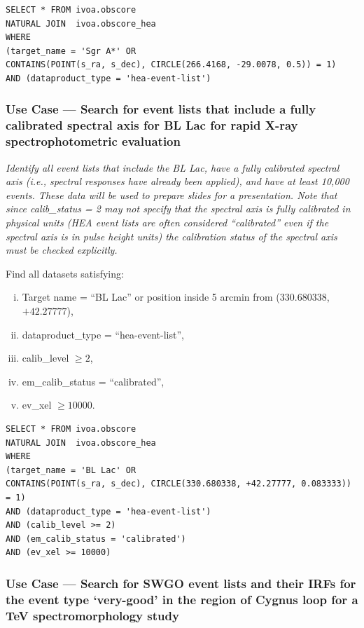 \begin{verbatim}
SELECT * FROM ivoa.obscore
NATURAL JOIN  ivoa.obscore_hea
WHERE
(target_name = 'Sgr A*' OR
CONTAINS(POINT(s_ra, s_dec), CIRCLE(266.4168, -29.0078, 0.5)) = 1)
AND (dataproduct_type = 'hea-event-list')
\end{verbatim}


\subsubsection{Use Case --- Search for event lists that include a fully calibrated spectral axis for BL Lac for rapid X-ray spectrophotometric evaluation}

{\em Identify all event lists that include the BL Lac, have a fully calibrated spectral axis (i.e., spectral responses have already been applied), and have at least 10,000 events.  These data will be used to prepare slides for a presentation.  Note that since calib\_status = 2 may not specify that the spectral axis is fully calibrated in physical units (HEA event lists are often considered ``calibrated'' even if the spectral axis is in pulse height units) the calibration status of the spectral axis must be checked explicitly.\/}

\medskip
\noindent Find all datasets satisfying:
\begin{enumerate}[(i)]
  \item Target name = ``BL Lac'' or position inside 5 arcmin from (330.680338, $+42.27777$),
  \item dataproduct\_type = ``hea-event-list'',
  \item calib\_level $\geq 2$,
  \item em\_calib\_status = ``calibrated'',
  \item ev\_xel $\geq 10000$.
\end{enumerate}

\begin{verbatim}
SELECT * FROM ivoa.obscore
NATURAL JOIN  ivoa.obscore_hea
WHERE
(target_name = 'BL Lac' OR
CONTAINS(POINT(s_ra, s_dec), CIRCLE(330.680338, +42.27777, 0.083333)) = 1)
AND (dataproduct_type = 'hea-event-list')
AND (calib_level >= 2)
AND (em_calib_status = 'calibrated')
AND (ev_xel >= 10000)
\end{verbatim}


\subsubsection{Use Case ---  Search for SWGO event lists and their \glspl{IRF} for the event type `very-good' in the region of Cygnus loop for a TeV spectromorphology study}

